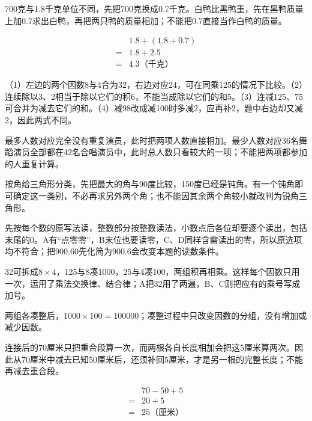 \documentclass[multi=snippet,border=0pt]{standalone}
\newenvironment{snippet}[3]{\begin{minipage}{#1bp}\color{answerred}\fontsize{#2}{#3}\selectfont\raggedright}{\end{minipage}}
\begin{document}
\begin{snippet}{505}{11.5}{14}700克与1.8千克单位不同，先把700克换成0.7千克。白鸭比黑鸭重，先在黑鸭质量上加0.7求出白鸭，再把两只鸭的质量相加；不能把0.7直接当作白鸭的质量。\par \[\begin{aligned}&1.8+(1.8+0.7)\\={}&1.8+2.5\\={}&4.3\text{（千克）}\end{aligned}\]\end{snippet}
\begin{snippet}{505}{11.5}{14}（1）左边的两个因数8与4合为32，右边对应24，可在同乘125的情况下比较。（2）连续除以3、2相当于除以它们的积6，不能当成除以它们的和5。（3）连减125、75可合并为减去它们的和。（4）减98改成减100时多减2，应再补2，题中右边却又减2，因此两式不同。\end{snippet}
\begin{snippet}{505}{11.5}{14}最多人数对应完全没有重复演员，此时把两项人数直接相加。最少人数对应36名舞蹈演员全部都在42名合唱演员中，此时总人数只看较大的一项；不能把两项都参加的人重复计算。\end{snippet}
\begin{snippet}{505}{11.5}{14}按角给三角形分类，先把最大的角与90度比较，150度已经是钝角。有一个钝角即可确定这一类别，不必再求另外两个角；也不能因其余两个角较小就改判为锐角三角形。\end{snippet}
\begin{snippet}{505}{11.5}{14}先按每个数的原写法读，整数部分按整数读法，小数点后各位却要逐个读出，包括末尾的0。A有“点零零”，B末位也要读零，C、D同样含需读出的零，所以原选项均不符合；把900.60先化简为900.6会改变本题的读数条件。\end{snippet}
\begin{snippet}{505}{11.5}{14}32可拆成\(8\times4\)，125与8凑1000，25与4凑100，两组积再相乘。这样每个因数只用一次，运用了乘法交换律、结合律；A把32用了两遍，B、C则把应有的乘号写成加号。\par 两组各凑整后，\(1000\times100=100000\)；凑整过程中只改变因数的分组，没有增加或减少因数。\end{snippet}
\begin{snippet}{505}{11.5}{14}连接后的70厘米只把重合段算一次，而两根各自长度相加会把这5厘米算两次。因此从70厘米中减去已知50厘米后，还须补回5厘米，才是另一根的完整长度；不能再减去重合段。\par \[\begin{aligned}&70-50+5\\={}&20+5\\={}&25\text{（厘米）}\end{aligned}\]\end{snippet}
\end{document}

